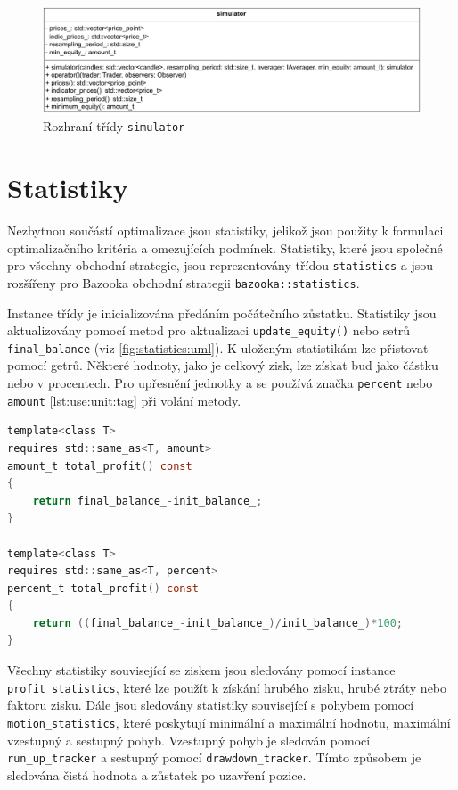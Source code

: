 \begin{figure}[htbp]
\centerline{\includegraphics[scale=0.85]{img/simulator-uml.pdf}}
\caption{Rozhraní třídy \texttt{simulator}}
\label{fig:position:uml}
\end{figure}

\section{Statistiky}
Nezbytnou součástí optimalizace jsou statistiky, jelikož jsou použity k formulaci optimalizačního kritéria a omezujících podmínek.
Statistiky, které jsou společné pro všechny obchodní strategie, jsou reprezentovány třídou \texttt{statistics} a jsou rozšířeny pro Bazooka obchodní strategii \texttt{bazooka::statistics}.

Instance třídy je inicializována předáním počátečního zůstatku.
Statistiky jsou aktualizovány pomocí metod pro aktualizaci \texttt{update\_equity()} nebo setrů \texttt{final\_balance} (viz \ref{fig:statistics:uml}).
K uloženým statistikám lze přistovat pomocí getrů.
Některé hodnoty, jako je celkový zisk, lze získat buď jako částku nebo v procentech.
Pro upřesnění jednotky a se používá značka \texttt{percent} nebo \texttt{amount} \ref{lst:use:unit:tag} při volání metody.

\begin{lstlisting}[caption={~Metody pro získání celkového zisku v různých jednotkách},label={lst:use:unit:tag},captionpos=t,abovecaptionskip=-\medskipamount,belowcaptionskip=\medskipamount,language=C]
template<class T>
requires std::same_as<T, amount>
amount_t total_profit() const
{
    return final_balance_-init_balance_;
}

template<class T>
requires std::same_as<T, percent>
percent_t total_profit() const
{
    return ((final_balance_-init_balance_)/init_balance_)*100;
}
\end{lstlisting}

Všechny statistiky související se ziskem jsou sledovány pomocí instance \texttt{profit\_statistics}, které lze použít k získání hrubého zisku, hrubé ztráty nebo faktoru zisku.
Dále jsou sledovány statistiky související s pohybem pomocí \texttt{motion\_statistics}, které poskytují minimální a maximální hodnotu, maximální vzestupný a sestupný pohyb.
Vzestupný pohyb je sledován pomocí \texttt{run\_up\_tracker} a sestupný pomocí \texttt{drawdown\_tracker}.
Tímto způsobem je sledována čistá hodnota a zůstatek po uzavření pozice.

